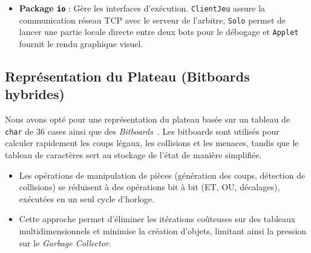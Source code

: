 \documentclass[12pt,a4paper]{article}
\begin{document}
\begin{itemize}
    \item \textbf{Package \texttt{io}} : Gère les interfaces d'exécution. \texttt{ClientJeu} assure la communication réseau TCP avec le serveur de l'arbitre, \texttt{Solo} permet de lancer une partie locale directe entre deux bots pour le débogage et \texttt{Applet} fournit le rendu graphique visuel.
\end{itemize}


\subsection{Représentation du Plateau (Bitboards hybrides)}
Nous avons opté pour une représentation du plateau basée sur un tableau de \texttt{char} de 36 cases ainsi que des \textit{Bitboards}~\cite{cp_bitboards}. Les bitboards sont utilisés pour calculer rapidement les coups légaux, les collisions et les menaces, tandis que le tableau de caractères sert au stockage de l'état de manière simplifiée.
\begin{itemize}
    \item Les opérations de manipulation de pièces (génération des coups, détection de collisions) se réduisent à des opérations bit à bit (ET, OU, décalages), exécutées en un seul cycle d'horloge.
    \item Cette approche permet d'éliminer les itérations coûteuses sur des tableaux multidimensionnels et minimise la création d'objets, limitant ainsi la pression sur le \textit{Garbage Collector}.
\end{itemize}
\end{document}
